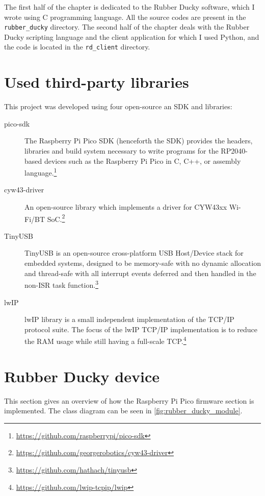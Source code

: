 The first half of the chapter is dedicated to the Rubber Ducky software, which I wrote using C programming language. All the source codes are present in the \verb|rubber_ducky| directory. The second half of the chapter deals with the Rubber Ducky scripting language and the client application for which I used Python, and the code is located in the \verb|rd_client| directory.

\section{Used third-party libraries}
\label{sec:implementation_libraries}
This project was developed using four open-source an SDK and libraries:
\begin{description}
    \item [pico-sdk] The Raspberry Pi Pico SDK (henceforth the SDK) provides the headers, libraries and build system necessary to write programs for the RP2040-based devices such as the Raspberry Pi Pico in C, C++, or assembly language.\footnote{\url{https://github.com/raspberrypi/pico-sdk}}
    \item [cyw43-driver] An open-source library which implements a driver for CYW43xx Wi-Fi/BT SoC.\footnote{\url{https://github.com/georgerobotics/cyw43-driver}}
    \item [TinyUSB] TinyUSB is an open-source cross-platform USB Host/Device stack for embedded systems, designed to be memory-safe with no dynamic allocation and thread-safe with all interrupt events deferred and then handled in the non-ISR task function.\footnote{\url{https://github.com/hathach/tinyusb}}
    \item [lwIP] lwIP library is a small independent implementation of the TCP/IP protocol suite. The focus of the lwIP TCP/IP implementation is to reduce the RAM usage while still having a full-scale TCP.\footnote{\url{https://github.com/lwip-tcpip/lwip}}
\end{description}

\section{Rubber Ducky device}
\label{sec:implementation_rubber_ducky}
This section gives an overview of how the Raspberry Pi Pico firmware section is implemented. The class diagram can be seen in \autoref{fig:rubber_ducky_module}.

